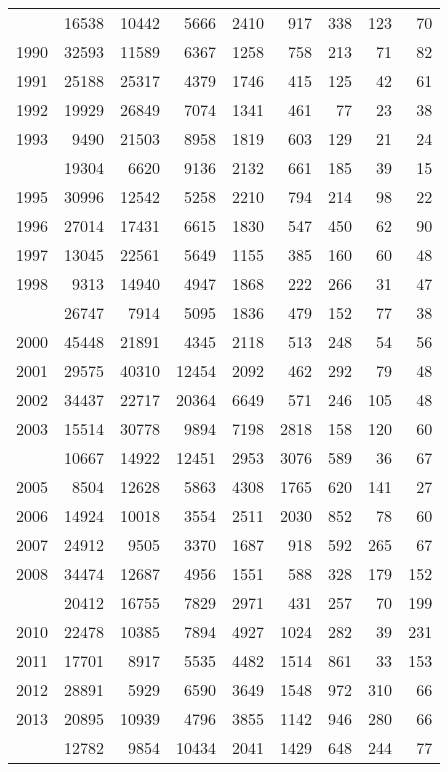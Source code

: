 \documentclass[
]{article}
\begin{document}
\begin{longtable}[t]{lrrrrrrrr}
\endfoot
\bottomrule
\endlastfoot
1989 & 16538 & 10442 & 5666 & 2410 & 917 & 338 & 123 & 70\\
1990 & 32593 & 11589 & 6367 & 1258 & 758 & 213 & 71 & 82\\
1991 & 25188 & 25317 & 4379 & 1746 & 415 & 125 & 42 & 61\\
1992 & 19929 & 26849 & 7074 & 1341 & 461 & 77 & 23 & 38\\
1993 & 9490 & 21503 & 8958 & 1819 & 603 & 129 & 21 & 24\\
\addlinespace
1994 & 19304 & 6620 & 9136 & 2132 & 661 & 185 & 39 & 15\\
1995 & 30996 & 12542 & 5258 & 2210 & 794 & 214 & 98 & 22\\
1996 & 27014 & 17431 & 6615 & 1830 & 547 & 450 & 62 & 90\\
1997 & 13045 & 22561 & 5649 & 1155 & 385 & 160 & 60 & 48\\
1998 & 9313 & 14940 & 4947 & 1868 & 222 & 266 & 31 & 47\\
\addlinespace
1999 & 26747 & 7914 & 5095 & 1836 & 479 & 152 & 77 & 38\\
2000 & 45448 & 21891 & 4345 & 2118 & 513 & 248 & 54 & 56\\
2001 & 29575 & 40310 & 12454 & 2092 & 462 & 292 & 79 & 48\\
2002 & 34437 & 22717 & 20364 & 6649 & 571 & 246 & 105 & 48\\
2003 & 15514 & 30778 & 9894 & 7198 & 2818 & 158 & 120 & 60\\
\addlinespace
2004 & 10667 & 14922 & 12451 & 2953 & 3076 & 589 & 36 & 67\\
2005 & 8504 & 12628 & 5863 & 4308 & 1765 & 620 & 141 & 27\\
2006 & 14924 & 10018 & 3554 & 2511 & 2030 & 852 & 78 & 60\\
2007 & 24912 & 9505 & 3370 & 1687 & 918 & 592 & 265 & 67\\
2008 & 34474 & 12687 & 4956 & 1551 & 588 & 328 & 179 & 152\\
\addlinespace
2009 & 20412 & 16755 & 7829 & 2971 & 431 & 257 & 70 & 199\\
2010 & 22478 & 10385 & 7894 & 4927 & 1024 & 282 & 39 & 231\\
2011 & 17701 & 8917 & 5535 & 4482 & 1514 & 861 & 33 & 153\\
2012 & 28891 & 5929 & 6590 & 3649 & 1548 & 972 & 310 & 66\\
2013 & 20895 & 10939 & 4796 & 3855 & 1142 & 946 & 280 & 66\\
\addlinespace
2014 & 12782 & 9854 & 10434 & 2041 & 1429 & 648 & 244 & 77\\

\end{longtable}
\end{document}
